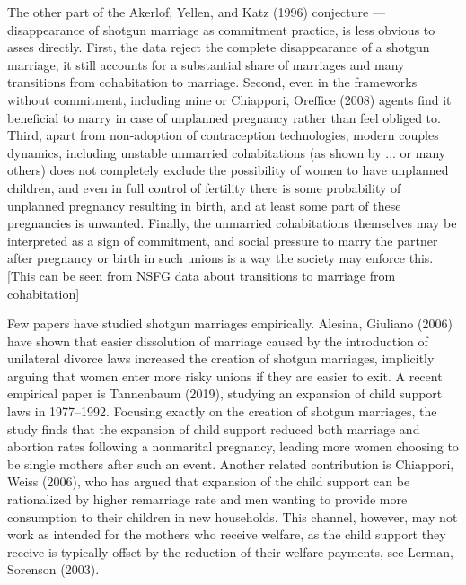 \documentclass[12pt,letter]{article}
\begin{document}
The other part of the Akerlof, Yellen, and Katz (1996) conjecture --- disappearance of shotgun marriage as commitment practice, is less obvious to asses directly.
First, the data reject the complete disappearance of a shotgun marriage, it still accounts for a substantial share of marriages and many transitions from cohabitation to marriage. Second, even in the frameworks without commitment, including mine or Chiappori, Oreffice (2008) agents find it beneficial to marry in case of unplanned pregnancy rather than feel obliged to.
Third, apart from non-adoption of contraception technologies, modern couples dynamics, including unstable unmarried cohabitations (as shown by ... or many others) does not completely exclude the possibility of women to have unplanned children, and even in full control of fertility there is some probability of unplanned pregnancy resulting in birth, and at least some part of these pregnancies is unwanted.
Finally, the unmarried cohabitations themselves may be interpreted as a sign of commitment, and social pressure to marry the partner after pregnancy or birth in such unions is a way the society may enforce this. [This can be seen from NSFG data about transitions to marriage from cohabitation]

Few papers have studied shotgun marriages empirically. Alesina, Giuliano (2006) have shown that easier dissolution of marriage caused by the introduction of unilateral divorce laws increased the creation of shotgun marriages, implicitly arguing that women enter more risky unions if they are easier to exit. A recent empirical paper is Tannenbaum (2019), studying an expansion of child support laws in 1977--1992. Focusing exactly on the creation of shotgun marriages, the study finds that the expansion of child support reduced both marriage and abortion rates following a nonmarital pregnancy, leading more women choosing to be single mothers after such an event. Another related contribution is Chiappori, Weiss (2006), who has argued that expansion of the child support can be rationalized by higher remarriage rate and men wanting to provide more consumption to their children in new households. This channel, however, may not work as intended for the mothers who receive welfare, as the child support they receive is typically offset by the reduction of their welfare payments, see Lerman, Sorenson (2003). 
\end{document}
